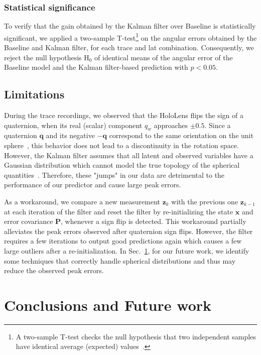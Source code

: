 \documentclass[sigconf]{acmart}			%
\newcommand{\matr}[1]{\mathrm{\mathbf{#1}}}
\begin{document}
\subsubsection*{Statistical significance}
To verify that the gain obtained by the Kalman filter over Baseline is statistically significant, we applied a two-sample T-test\footnote{A two-sample T-test checks the null hypothesis that two independent samples have identical average (expected) values~\cite{hogg2005}.} on the angular errors obtained by the Baseline and Kalman filter, for each trace and \gls{lat} combination.
Consequently, we reject the null hypothesis $\mathrm{H}_0$ of identical means of the angular error of the Baseline model and the Kalman filter-based prediction with $p<0.05$.

\subsection{Limitations}
\label{sec:limitations}
During the trace recordings, we observed that the HoloLens flips the sign of a quaternion, when its real (scalar) component $q_w$ approaches $\pm 0.5$.
Since a quaternion $\mathbf{q}$ and its negative $\mathbf{-q}$ correspond to the same orientation on the unit sphere~\cite{sola2017}, this behavior does not lead to a discontinuity in the rotation space.
However, the Kalman filter assumes that all latent and observed variables have a Gaussian distribution which cannot model the true topology of the spherical quantities~\cite{kurz2016}.
Therefore, these "jumps" in our data are detrimental to the performance of our predictor and cause large peak errors.

As a workaround, we compare a new measurement $\mathbf{z}_k$ with the previous one $\mathbf{z}_{k-1}$ at each iteration of the filter and reset the filter by re-initializing the state $\mathbf{x}$ and error covariance $\matr{P}$, whenever a sign flip is detected.
This workaround partially alleviates the peak errors observed after quaternion sign flips.
However, the filter requires a few iterations to output good predictions again which causes a few large outliers after a re-initialization.
In Sec.~\ref{sec:conclusion}, for our future work, we identify some techniques that correctly handle spherical distributions and thus may reduce the observed peak errors.

\section{Conclusions and Future work}
\label{sec:conclusion}
\end{document}
